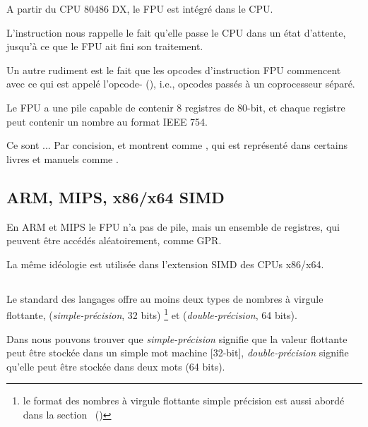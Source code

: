 A partir du CPU 80486 DX, le \ac{FPU} est intégré dans le \ac{CPU}.

L'instruction  nous rappelle le fait qu'elle passe le \ac{CPU} dans un
état d'attente, jusqu'à ce que le \ac{FPU} ait fini son traitement.

Un autre rudiment est le fait que les opcodes d'instruction \ac{FPU} commencent
avec ce qui est appelé l'opcode- (), i.e., opcodes
passés à un coprocesseur séparé.

\label{FPU_is_stack}

Le FPU a une pile capable de contenir 8 registres de 80-bit, et chaque registre peut
contenir un nombre au format IEEE 754\FNURLIEEE.

Ce sont ... Par concision, \IDA et \olly montrent  comme ,
qui est représenté dans certains livres et manuels comme .

\subsection{ARM, MIPS, x86/x64 SIMD}

En ARM et MIPS le FPU n'a pas de pile, mais un ensemble de registres, qui peuvent
être accédés aléatoirement, comme \ac{GPR}.

La même idéologie est utilisée dans l'extension SIMD des CPUs x86/x64.

\subsection{\CCpp}


Le standard des langages \CCpp offre au moins deux types de nombres à virgule flottante,
\Tfloat (\emph{simple-précision}\FNURLSP, 32 bits) \footnote{le format des nombres
à virgule flottante simple précision est aussi abordé dans la section \emph{\WorkingWithFloatAsWithStructSubSubSectionName}~()}
et \Tdouble  (\emph{double-précision}\FNURLDP, 64 bits).

Dans  nous pouvons trouver que \emph{simple-précision}
signifie que la valeur flottante peut être stockée dans un simple mot machine [32-bit],
\emph{double-précision} signifie qu'elle peut être stockée dans deux mots (64 bits).



